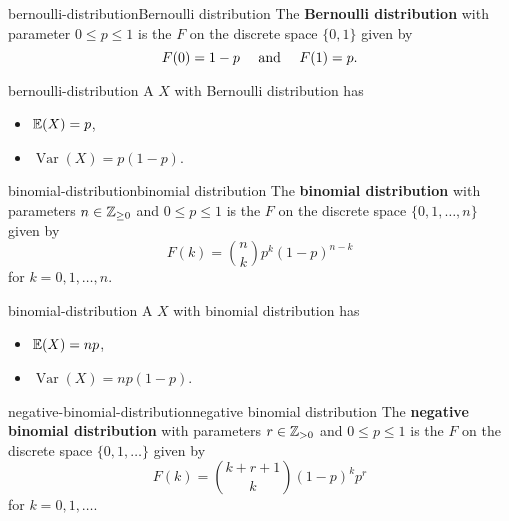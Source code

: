 \begin{topic}{bernoulli-distribution}{Bernoulli distribution}
    The \textbf{Bernoulli distribution} with parameter $0 \le p \le 1$ is the  $F$ on the discrete space $\{ 0, 1 \}$ given by
    \[ F(0) = 1 - p \quad \textup{ and } \quad F(1) = p . \]
\end{topic}

\begin{example}{bernoulli-distribution}
    A  $X$ with Bernoulli distribution has
    \begin{itemize}
        \item {} $\mathbb{E}(X) = p$,
        \item {} $\operatorname{Var}(X) = p (1 - p)$.
    \end{itemize}
\end{example}

\begin{topic}{binomial-distribution}{binomial distribution}
    The \textbf{binomial distribution} with parameters $n \in \mathbb{Z}_{\ge 0}$ and $0 \le p \le 1$ is the  $F$ on the discrete space $\{ 0, 1, \ldots, n \}$ given by
    \[ F(k) = \binom{n}{k} p^k (1 - p)^{n - k} \]
    for $k = 0, 1, \ldots, n$.
\end{topic}

\begin{example}{binomial-distribution}
    A  $X$ with binomial distribution has
    \begin{itemize}
        \item {} $\mathbb{E}(X) = n p$,
        \item {} $\operatorname{Var}(X) = n p (1 - p)$.
    \end{itemize}
\end{example}

\begin{topic}{negative-binomial-distribution}{negative binomial distribution}
    The \textbf{negative binomial distribution} with parameters $r \in \mathbb{Z}_{> 0}$ and $0 \le p \le 1$ is the  $F$ on the discrete space $\{ 0, 1, \ldots \}$ given by
    \[ F(k) = \binom{k + r + 1}{k} (1 - p)^k p^r \]
    for $k = 0, 1, \ldots$.
\end{topic}

